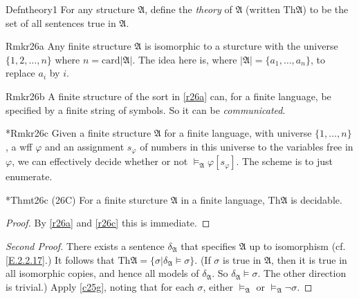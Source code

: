 \begin{reference}{Defn}{theory1}
  For any structure $\mathfrak{A}$, define the \textit{theory} of $\mathfrak{A}$ (written $\mathrm{Th}\mathfrak{A}$) to be the set of all sentences true in $\mathfrak{A}$.
\end{reference}

\begin{reference}{Rmk}{r26a}
  Any finite structure $\mathfrak{A}$ is isomorphic to a sturcture with the universe $\{1,2,\dots,n\}$ where $n=\mathrm{card}|\mathfrak{A}|$. The idea here is, where $|\mathfrak{A}|=\{a_1,\dots,a_n\}$, to replace $a_i$ by $i$.
\end{reference}

\begin{reference}{Rmk}{r26b}
  A finite structure of the sort in \ref{r26a} can, for a finite language, be specified by a finite string of symbols. So it can be \textit{communicated}.
\end{reference}

\begin{reference}{*Rmk}{r26c}
  Given a finite structure $\mathfrak{A}$ for a finite language, with universe $\{1,\dots,n\}$, a wff $\varphi$ and an assignment $s_{\varphi}$ of numbers in this universe to the variables free in $\varphi$, we can effectively decide whether or not $\vDash_{\mathfrak{A}}\varphi[s_{\varphi}]$. The scheme is to just enumerate.
\end{reference}

\begin{reference}{*Thm}{t26c}
  (26C) For a finite sturcture $\mathfrak{A}$ in a finite language, $\mathrm{Th}\mathfrak{A}$ is decidable.
\end{reference}

\begin{proof}
  By \ref{r26a} and \ref{r26c} this is immediate.
\end{proof}

\begin{proof}[Second Proof]
  There exists a sentence $\delta_{\mathfrak{A}}$ that specifies $\mathfrak{A}$ up to isomorphism (cf. \ref{E.2.2.17}.) It follows that $\mathrm{Th}\mathfrak{A}=\{\sigma|\delta_{\mathfrak{A}}\vDash \sigma\}.$ (If $\sigma$ is true in $\mathfrak{A}$, then it is true in all isomorphic copies, and hence all models of $\delta_{\mathfrak{A}}$. So $\delta_{\mathfrak{A}}\vDash \sigma$. The other direction is trivial.) Apply \ref{c25g}, noting that for each $\sigma$, either $\vDash_{\mathfrak{A}}$ or $\vDash_{\mathfrak{A}}\neg \sigma$.
\end{proof}

